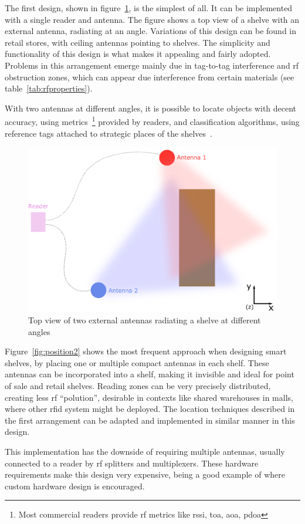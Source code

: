 The first design, shown in figure~\ref{fig:position1}, is the simplest of all. It can be implemented with a single reader and antenna. The figure shows a top view of a shelve with an external antenna, radiating at an angle. Variations of this design can be found in retail stores, with ceiling antennas pointing to shelves.
The simplicity and functionality of this design is what makes it appealing and fairly adopted.
Problems in this arrangement emerge mainly due in tag-to-tag interference and \ac{rf} obstruction zones, which can appear due interference from certain materials (see table~\ref{tab:rfproperties}).

With two antennas at different angles, it is possible to locate objects with decent accuracy, using metrics~\footnote{Most commercial readers provide \ac{rf} metrics like \ac{rssi}, \ac{toa}, \ac{aoa}, \ac{pdoa}} provided by readers, and classification algorithms, using reference tags attached to strategic places of the shelves~\cite{dalessandroRFIDBasedSmartShelving2012}.

\begin{figure}[H]
    \centering
    \includegraphics[width=0.6\linewidth]{./figs/02-state-of-the-art/position1.eps}
    \caption{Top view of two external antennas radiating a shelve at different angles}
    \label{fig:position1}
\end{figure}

Figure~\ref{fig:position2} shows the most frequent approach when designing smart shelves, by placing one or multiple compact antennas in each shelf.
These antennas can be incorporated into a shelf, making it invisible and ideal for point of sale and retail shelves.
Reading zones can be very precisely distributed, creating less \ac{rf} ``polution'', desirable in contexts like shared warehouses in malls, where other \ac{rfid} system might be deployed.
The location techniques described in the first arrangement can be adapted and implemented in similar manner in this design.

This implementation has the downside of requiring multiple antennas, usually connected to a reader by \ac{rf} splitters and multiplexers.
These hardware requirements make this design very expensive, being a good example of where custom hardware design is encouraged.

